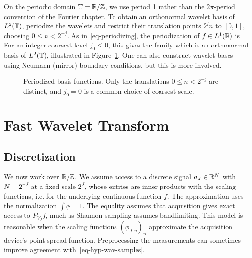 On the periodic domain $\mathbb{T}=\mathbb{R}/\mathbb{Z}$, we use period 1 rather than the $2\pi$-period convention of the Fourier chapter. To obtain an orthonormal wavelet basis of $L^2(\mathbb{T})$, periodize the wavelets and restrict their translation points $2^j n$ to $[0,1]$, choosing $0 \leq n < 2^{-j}$. As in~\eqref{eq-periodizing}, the periodization of $f \in L^1(\mathbb{R})$ is
For an integer coarsest level $j_0\leq0$, this gives the family
which is an orthonormal basis of $L^2(\mathbb{T})$, illustrated in Figure~\ref{fig-periodize}.
%
One can also construct wavelet bases using Neumann (mirror) boundary conditions, but this is more involved.



\begin{figure}[tbp]
\centering
{}\hfill
{}
\caption{Periodized basis functions. Only the translations $0\leq n<2^{-j}$ are distinct, and $j_0=0$ is a common choice of coarsest scale.}
\label{fig-periodize}
\end{figure}



\section{Fast Wavelet Transform}\label{sec-fast-wavelet-transform}

\subsection{Discretization}

We now work over $\mathbb{R}/\mathbb{Z}$.
%
We assume access to a discrete signal $a_J \in \mathbb{R}^N$ with $N = 2^{-J}$ at a fixed scale $2^J$, whose entries are inner products with the scaling functions, i.e.
for the underlying continuous function $f$. The approximation uses the normalization $\int\phi=1$. The equality assumes that acquisition gives exact access to $P_{V_J}f$, much as Shannon sampling assumes bandlimiting. This model is reasonable when the scaling functions $(\phi_{J,n})_n$ approximate the acquisition device's point-spread function. Preprocessing the measurements can sometimes improve agreement with~\eqref{eq-hyp-wav-samples}.

